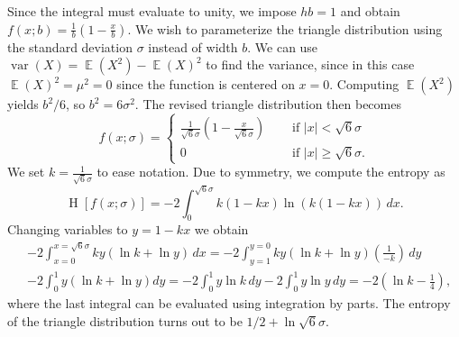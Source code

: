 \documentclass[12pt, a4paper]{article}
\newcommand{\abs}[1]{\left\lvert#1\right\rvert}
\DeclareMathOperator{\E}{\mathbb{E}}
\DeclareMathOperator{\var}{\operatorname{var}}
\renewcommand{\H}{\operatorname{H}}
\begin{document}
Since the integral must evaluate to unity, we impose $hb = 1$ and obtain $f(x;b) = \frac{1}{b} \left( 1- \frac{x}{b}\right)$.
We wish to parameterize the triangle distribution using the standard deviation $\sigma$ instead of width $b$.
We can use $\var(X) = \E(X^2) - \E(X)^2$ to find the variance, since in this case $\E(X)^2 = \mu^2 = 0$ since the function is centered on $x=0$.
Computing $\E(X^2)$ yields $b^2 / 6$, so $b^2 = 6 \sigma^2$.
The revised triangle distribution then becomes
\begin{equation*}
f(x; \sigma) = \begin{cases}
\frac{1}{\sqrt{6} \sigma} \left(1 - \frac{x}{\sqrt{6} \sigma}\right) &\quad \text{ if } \abs{x} < \sqrt{6} \sigma \\
0 &\quad \text{ if } \abs{x} \geq \sqrt{6} \sigma .
\end{cases}
\end{equation*}
We set $k = \frac{1}{\sqrt{6} \sigma}$ to ease notation.
Due to symmetry, we compute the entropy as 
\begin{equation*}
	\H\left[f(x; \sigma)\right] = - 2 \int_{0}^{\sqrt{6} \sigma} k \left(1 - kx\right) \ln \left( k \left(1 - k x \right) \right) \, dx.
\end{equation*}
Changing variables to $y = 1 - kx$ we obtain
\begin{align*}
& - 2 \int_{x=0}^{x=\sqrt{6} \sigma} k y  \left( \ln k + \ln y \right) \, dx = - 2 \int_{y = 1}^{y = 0} k y  \left( \ln k + \ln y \right) \left(\frac{1}{-k}\right) \, dy \\
& - 2 \int_{0}^{1} y \left( \ln k + \ln y \right) dy = - 2 \int_{0}^{1} y \ln k \, dy - 2 \int_{0}^{1} y  \ln y \, dy = -2 \left( \ln k - \frac{1}{4}\right),
\end{align*}
where the last integral can be evaluated using integration by parts.
The entropy of the triangle distribution turns out to be $1/2 + \ln \sqrt{6} \sigma$.
\end{document}
